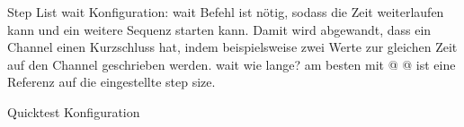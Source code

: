 Step List wait Konfiguration:
wait Befehl ist nötig, sodass die Zeit weiterlaufen kann und ein weitere Sequenz starten kann.
Damit wird abgewandt, dass ein Channel einen Kurzschluss hat, indem beispielsweise zwei Werte zur gleichen Zeit
auf den Channel geschrieben werden.
wait wie lange?
am besten mit @
@ ist eine Referenz auf die eingestellte step size.

Quicktest Konfiguration
